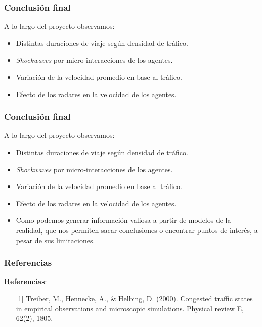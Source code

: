 \documentclass[10pt, compress]{beamer}
\begin{document}
\begin{frame}[fragile]
\frametitle{Conclusi\'on final}

A lo largo del proyecto observamos:
\begin{itemize}
\item Distintas duraciones de viaje seg\'un densidad de tr\'afico.
\item \textit{Shockwaves} por micro-interacciones de los agentes.
\item Variaci\'on de la velocidad promedio en base al tr\'afico.
\item Efecto de los radares en la velocidad de los agentes.
\end{itemize}
\addtocounter{framenumber}{-1}
\end{frame}

\begin{frame}[fragile]
\frametitle{Conclusi\'on final}

A lo largo del proyecto observamos:
\begin{itemize}
\item Distintas duraciones de viaje seg\'un densidad de tr\'afico.
\item \textit{Shockwaves} por micro-interacciones de los agentes.
\item Variaci\'on de la velocidad promedio en base al tr\'afico.
\item Efecto de los radares en la velocidad de los agentes.
\item Como podemos generar informaci\'on valiosa a partir de modelos de la realidad, que nos permiten sacar conclusiones o encontrar puntos de inter\'es, a pesar de sus limitaciones.
\end{itemize}
\addtocounter{framenumber}{-1}
\end{frame}

\begin{frame}[fragile]

\frametitle{Referencias}

\textbf{Referencias}:
\begin{itemize}
\item [{[1]}] Treiber, M., Hennecke, A., \& Helbing, D. (2000). Congested traffic states in empirical observations and microscopic simulations. Physical review E, 62(2), 1805.
\end{itemize}
 
\end{frame}
\end{document}
